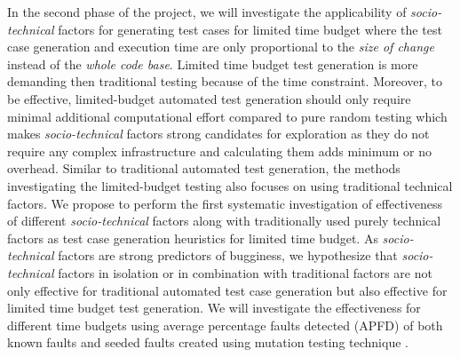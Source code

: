 \documentclass[10pt]{article}
\begin{document}
 In the second phase of the project, we will investigate the applicability of \emph{socio-technical} factors for generating test cases for limited time budget where the test case generation and execution time are only proportional to the \emph{size of change} instead of the \emph{whole code base}. Limited time budget test generation is more demanding then traditional testing because of the time constraint. Moreover, to be effective, limited-budget automated test generation should only require minimal additional computational effort compared to pure random testing which makes \emph{socio-technical} factors strong candidates for exploration as they do not require any complex infrastructure and calculating them adds minimum or no overhead. Similar to traditional automated test generation, the methods investigating the limited-budget testing \cite{groce2012lightweight} also focuses on using traditional technical factors. We propose to perform the first systematic investigation of effectiveness of different \emph{socio-technical} factors along with traditionally used purely technical factors as test case generation heuristics for limited time budget. As \emph{socio-technical} factors are strong predictors of bugginess, we hypothesize that \emph{socio-technical} factors in isolation or in combination with traditional factors are not only effective for traditional automated test case generation but also effective for limited time budget test generation. We will investigate the effectiveness for different time budgets using average percentage faults detected (APFD) \cite{elbaum2002test} of both known faults and seeded faults created using mutation testing technique \cite{ahmed2017applying}.




 

\end{document}
